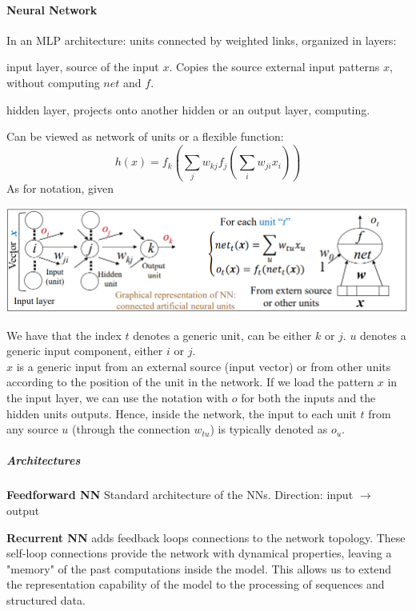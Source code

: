 \documentclass[10pt]{report}
\begin{document}
\paragraph{Neural Network} In an MLP architecture: units connected by weighted links, organized in layers:
\begin{list}{}{}
	\item input layer, source of the input $x$. Copies the source external input patterns $x$, without computing $net$ and $f$.
	\item hidden layer, projects onto another hidden or an output layer, computing.
\end{list}
Can be viewed as network of units or a flexible function:
$$h(x) = f_k\left(\sum_j w_{kj}f_j\left(\sum_i w_{ji}x_i\right)\right)$$
As for notation, given
\begin{center}
	\includegraphics[scale=0.6]{7.png}
\end{center}
We have that the index $t$ denotes a generic unit, can be either $k$ or $j$. $u$ denotes a generic input component, either $i$ or $j$.\\
$x$ is a generic input from an external source (input vector) or from other units according to the position of the unit in the network. If we load the pattern $x$ in the input layer, we can use the notation with $o$ for both the inputs and the hidden units outputs. Hence, inside the network, the input to each unit $t$ from any source $u$ (through the connection $w_{tu}$) is typically denoted as $o_u$.
\subparagraph{Architectures}
\begin{list}{}{}
	\item \textbf{Feedforward NN} Standard architecture of the NNs. Direction: input $\longrightarrow$ output\\
	\item \textbf{Recurrent NN} adds feedback loops connections to the network topology. These self-loop connections provide the network with dynamical properties, leaving a "memory" of the past computations inside the model. This allows us to extend the representation capability of the model to the processing of sequences and structured data.
\end{list}
\end{document}
